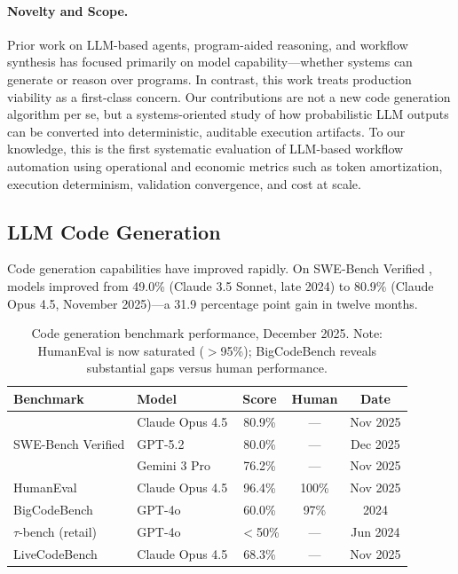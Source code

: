 \documentclass[11pt]{article}
\begin{document}
\paragraph{Novelty and Scope.}
Prior work on LLM-based agents, program-aided reasoning, and workflow synthesis has focused primarily on model capability—whether systems can generate or reason over programs. In contrast, this work treats production viability as a first-class concern. Our contributions are not a new code generation algorithm per se, but a systems-oriented study of how probabilistic LLM outputs can be converted into deterministic, auditable execution artifacts. To our knowledge, this is the first systematic evaluation of LLM-based workflow automation using operational and economic metrics such as token amortization, execution determinism, validation convergence, and cost at scale.

\subsection{LLM Code Generation}

Code generation capabilities have improved rapidly. On SWE-Bench Verified \citep{jimenez2024swebench}, models improved from 49.0\% (Claude 3.5 Sonnet, late 2024) to 80.9\% (Claude Opus 4.5, November 2025)—a 31.9 percentage point gain in twelve months.

\begin{table}[ht]
\centering
\caption{Code generation benchmark performance, December 2025. Note: HumanEval is now saturated ($>$95\%); BigCodeBench reveals substantial gaps versus human performance.}
\label{tab:benchmarks}
\begin{tabular}{llccc}
\toprule
Benchmark & Model & Score & Human & Date \\
\midrule
\multirow{3}{*}{SWE-Bench Verified} & Claude Opus 4.5 & 80.9\% & --- & Nov 2025 \\
 & GPT-5.2 & 80.0\% & --- & Dec 2025 \\
 & Gemini 3 Pro & 76.2\% & --- & Nov 2025 \\
\midrule
HumanEval & Claude Opus 4.5 & 96.4\% & 100\% & Nov 2025 \\
\midrule
BigCodeBench \citep{zhuo2024bigcodebench} & GPT-4o & 60.0\% & 97\% & 2024 \\
\midrule
$\tau$-bench (retail) \citep{yao2024taubench} & GPT-4o & $<$50\% & --- & Jun 2024 \\
\midrule
LiveCodeBench & Claude Opus 4.5 & 68.3\% & --- & Nov 2025 \\
\bottomrule
\end{tabular}
\end{table}
\end{document}
